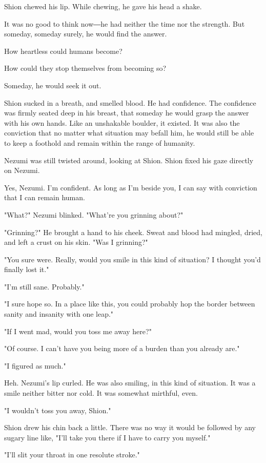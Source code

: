 Shion chewed his lip. While chewing, he gave his head a shake.

It was no good to think now―he had neither the time nor the strength.
But someday, someday surely, he would find the answer.

How heartless could humans become?

How could they stop themselves from becoming so?

Someday, he would seek it out.

Shion sucked in a breath, and smelled blood. He had confidence. The
confidence was firmly seated deep in his breast, that someday he would
grasp the answer with his own hands. Like an unshakable boulder, it
existed. It was also the conviction that no matter what situation may
befall him, he would still be able to keep a foothold and remain within
the range of humanity.

Nezumi was still twisted around, looking at Shion. Shion fixed his gaze
directly on Nezumi.~

Yes, Nezumi. I'm confident. As long as I'm beside you, I can say with
conviction that I can remain human.

"What?" Nezumi blinked. "What're you grinning about?"

"Grinning?" He brought a hand to his cheek. Sweat and blood had mingled,
dried, and left a crust on his skin. "Was I grinning?"

"You sure were. Really, would you smile in this kind of situation? I
thought you'd finally lost it."

"I'm still sane. Probably."

"I sure hope so. In a place like this, you could probably hop the border
between sanity and insanity with one leap."

"If I went mad, would you toss me away here?"

"Of course. I can't have you being more of a burden than you already
are."

"I figured as much."

Heh. Nezumi's lip curled. He was also smiling, in this kind of
situation. It was a smile neither bitter nor cold. It was somewhat
mirthful, even.

"I wouldn't toss you away, Shion."

Shion drew his chin back a little. There was no way it would be followed
by any sugary line like, "I'll take you there if I have to carry you
myself."

"I'll slit your throat in one resolute stroke."

